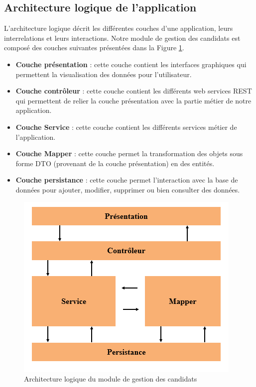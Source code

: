  \subsection{Architecture logique de l'application}
 L’architecture logique décrit les différentes couches d’une application, leurs interrelations et leurs interactions. Notre module de gestion des candidats est composé des couches suivantes présentées dans la Figure \ref{fig:archi_logique}.
 \begin{itemize}
     \item \textbf{Couche présentation} : cette couche contient les interfaces graphiques qui permettent la visualisation des données pour l'utilisateur.
     \item \textbf{Couche contrôleur} : cette couche contient les différents web services REST qui permettent de relier la couche présentation avec la partie métier de notre application.
     \item \textbf{Couche Service} : cette couche contient les différents services métier de l'application.
     \item \textbf{Couche Mapper} : cette couche permet la transformation des objets sous forme DTO (provenant de la couche présentation) en des entités.
     \item \textbf{Couche persistance} : cette couche permet l'interaction avec la base de données pour ajouter, modifier, supprimer ou bien consulter des données.
 \end{itemize}
 \begin{figure}[H]
     \centering
     \includegraphics[scale=1]{img/archi logique.PNG}
     \caption{Architecture logique du module de gestion des candidats}
     \label{fig:archi_logique}
 \end{figure}
